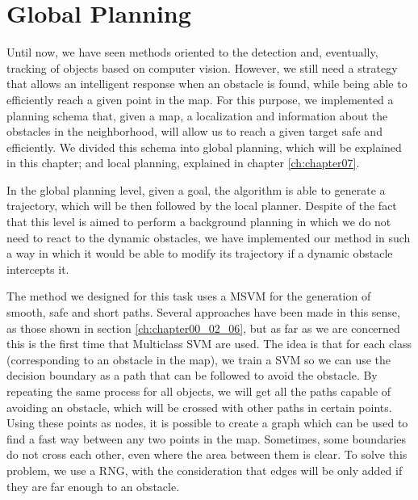 
\graphicspath{{./images/chapter06/bmps/}{./images/chapter06/vects/}{./images/chapter06/}}

\chapter{Global Planning}\label{ch:chapter06}

Until now, we have seen methods oriented to the detection and, eventually, tracking of objects based on computer vision. However, we still need a strategy that allows an intelligent response when an obstacle is found, while being able to efficiently reach a given point in the map. For this purpose, we implemented a planning schema that, given a map, a localization and information about the obstacles in the neighborhood, will allow us to reach a given target safe and efficiently. We divided this schema into global planning, which will be explained in this chapter; and local planning, explained in chapter \ref{ch:chapter07}.

In the global planning level, given a goal, the algorithm is able to generate a trajectory, which will be then followed by the local planner. Despite of the fact that this level is aimed to perform a background planning in which we do not need to react to the dynamic obstacles, we have implemented our method in such a way in which it would be able to modify its trajectory if a dynamic obstacle intercepts it.

The method we designed for this task uses a \ac{MSVM} for the generation of smooth, safe and short paths. Several approaches have been made in this sense, as those shown in section \ref{ch:chapter00_02_06}, but as far as we are concerned this is the first time that Multiclass \acs{SVM} are used. The idea is that for each class (corresponding to an obstacle in the map), we train a \ac{SVM} so we can use the decision boundary as a path that can be followed to avoid the obstacle. By repeating the same process for all objects, we will get all the paths capable of avoiding an obstacle, which will be crossed with other paths in certain points. Using these points as nodes, it is possible to create a graph which can be used to find a fast way between any two points in the map. Sometimes, some boundaries do not cross each other, even where the area between them is clear. To solve this problem, we use a \ac{RNG}, with the consideration that edges will be only added if they are far enough to an obstacle.

